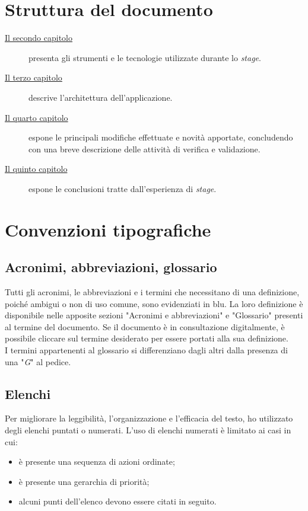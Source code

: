 \section{Struttura del documento}

\begin{description}
    \item[{\hyperref[cap:tecnologie-strumenti]{Il secondo capitolo}}] presenta gli strumenti e le tecnologie utilizzate durante lo \textit{stage}.
    
    \item[{\hyperref[cap:design]{Il terzo capitolo}}] descrive l'architettura dell'applicazione.
    
    \item[{\hyperref[cap:codifica]{Il quarto capitolo}}] espone le principali modifiche effettuate e novità apportate, concludendo con una breve descrizione delle attività di verifica e validazione.
    
    \item[{\hyperref[cap:conclusioni]{Il quinto capitolo}}] espone le conclusioni tratte dall'esperienza di \textit{stage}.
\end{description}

\section{Convenzioni tipografiche}

\subsection{Acronimi, abbreviazioni, glossario}

Tutti gli acronimi, le abbreviazioni e i termini che necessitano di una definizione, poiché ambigui o non di uso comune, sono evidenziati in blu. La loro definizione è disponibile nelle apposite sezioni "Acronimi e abbreviazioni" e "Glossario" presenti al termine del documento. Se il documento è in consultazione digitalmente, è possibile cliccare sul termine desiderato per essere portati alla sua definizione.\\
I termini appartenenti al glossario si differenziano dagli altri dalla presenza di una "\textit{G}" al pedice.

\subsection{Elenchi}

Per migliorare la leggibilità, l'organizzazione e l'efficacia del testo, ho utilizzato degli elenchi puntati o numerati. L'uso di elenchi numerati è limitato ai casi in cui:
\begin{itemize}
    \item è presente una sequenza di azioni ordinate;
    \item è presente una gerarchia di priorità;
    \item alcuni punti dell'elenco devono essere citati in seguito.
\end{itemize}

